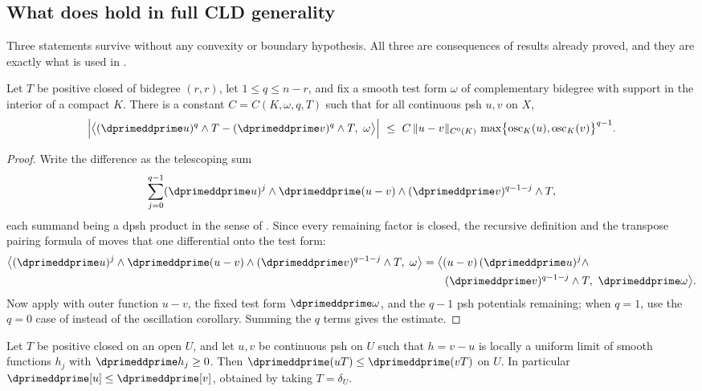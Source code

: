 \subsection{What does hold in full CLD generality}
\label{sec:ch16-comparison-general}

Three statements survive without any convexity or boundary hypothesis.  All
three are consequences of results already proved, and they are exactly what
is used in .

\begin{proposition}
\label{prop:ch16-mass-monotone}
Let $T$ be positive closed of bidegree $(r,r)$, let $1\leq q\leq n-r$, and fix a
smooth test form $\omega$ of complementary bidegree with support in the
interior of a compact $K$.  There is a constant $C=C(K,\omega,q,T)$ such
that for all continuous psh $u,v$ on $X$,
\[
 \Bigl|\bigl\langle
   (\dprimeddprime u)^q\wedge T-(\dprimeddprime v)^q\wedge T,\ \omega
 \bigr\rangle\Bigr|
 \ \leq\ C\,\|u-v\|_{C^0(K)}\,
   \max\bigl\{\operatorname{osc}_K(u),\operatorname{osc}_K(v)\bigr\}^{q-1}.
\]
\end{proposition}

\begin{proof}
Write the difference as the telescoping sum
\[
 \sum_{j=0}^{q-1}(\dprimeddprime u)^j\wedge\dprimeddprime(u-v)\wedge
   (\dprimeddprime v)^{q-1-j}\wedge T ,
\]
each summand being a dpsh product in the sense of
.  Since every remaining factor is closed,
the recursive definition and the transpose pairing formula of
 moves that one differential onto
the test form:
\[
 \begin{aligned}
 \bigl\langle(\dprimeddprime u)^j\wedge\dprimeddprime(u-v)\wedge
   (\dprimeddprime v)^{q-1-j}\wedge T,\ \omega\bigr\rangle
 &=\bigl\langle(u-v)\,(\dprimeddprime u)^j\wedge\\
 &\qquad
   (\dprimeddprime v)^{q-1-j}\wedge T,\ \dprimeddprime\omega\bigr\rangle .
 \end{aligned}
\]
Now apply  with outer function $u-v$, the
fixed test form $\dprimeddprime\omega$, and the $q-1$ psh potentials
remaining; when $q=1$, use the $q=0$ case of 
instead of the oscillation corollary.  Summing the $q$ terms gives the
estimate.
\end{proof}

\begin{proposition}
\label{prop:ch16-bt-comparison}
Let $T$ be positive closed on an open $U$, and let $u,v$ be continuous psh
on $U$ such that $h=v-u$ is locally a uniform limit of smooth functions
$h_j$ with $\dprimeddprime h_j\geq0$.  Then
$\dprimeddprime(uT)\leq\dprimeddprime(vT)$ on $U$.  In particular
$\dprimeddprime[u]\leq\dprimeddprime[v]$, obtained by taking $T=\delta_U$.
\end{proposition}

